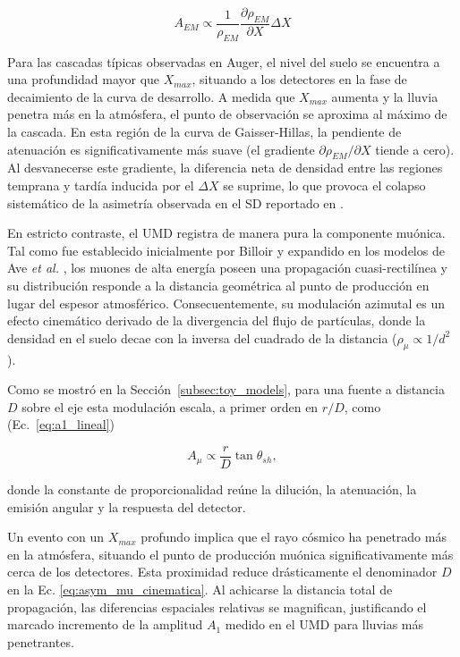 \begin{equation}
	A_{EM} \propto \frac{1}{\rho_{EM}} \frac{\partial \rho_{EM}}{\partial X} \Delta X
	\label{eq:asym_em_taylor}
\end{equation}

Para las cascadas típicas observadas en Auger, el nivel del suelo se encuentra a una profundidad mayor que $X_{max}$, situando a los detectores en la fase de decaimiento de la curva de desarrollo. A medida que $X_{max}$ aumenta y la lluvia penetra más en la atmósfera, el punto de observación se aproxima al máximo de la cascada. En esta región de la curva de Gaisser-Hillas, la pendiente de atenuación es significativamente más suave (el gradiente $\partial \rho_{EM} / \partial X$ tiende a cero). Al desvanecerse este gradiente, la diferencia neta de densidad entre las regiones temprana y tardía inducida por el $\Delta X$ se suprime, lo que provoca el colapso sistemático de la asimetría observada en el SD reportado en \cite{BradfieldThesis}.

En estricto contraste, el UMD registra de manera pura la componente muónica. Tal como fue establecido inicialmente por Billoir \cite{GAP2000_017} y expandido en los modelos de Ave \textit{et al.} \cite{ave2017}, los muones de alta energía poseen una propagación cuasi-rectilínea y su distribución responde a la distancia geométrica al punto de producción en lugar del espesor atmosférico. Consecuentemente, su modulación azimutal es un efecto cinemático derivado de la divergencia del flujo de partículas, donde la densidad en el suelo decae con la inversa del cuadrado de la distancia ($\rho_\mu \propto 1/d^2$). 

Como se mostró en la Sección~\ref{subsec:toy_models}, para una fuente a distancia $D$ sobre el eje esta modulación escala, a primer orden en $r/D$, como (Ec.~\ref{eq:a1_lineal})

\begin{equation}
	A_{\mu} \propto \frac{r}{D}\tan\theta_{sh},
	\label{eq:asym_mu_cinematica}
\end{equation}

donde la constante de proporcionalidad reúne la dilución, la atenuación, la emisión angular y la respuesta del detector.

Un evento con un $X_{max}$ profundo implica que el rayo cósmico ha penetrado más en la atmósfera, situando el punto de producción muónica significativamente más cerca de los detectores. Esta proximidad reduce drásticamente el denominador $D$ en la Ec. \ref{eq:asym_mu_cinematica}. Al achicarse la distancia total de propagación, las diferencias espaciales relativas se magnifican, justificando el marcado incremento de la amplitud $A_1$ medido en el UMD para lluvias más penetrantes.

